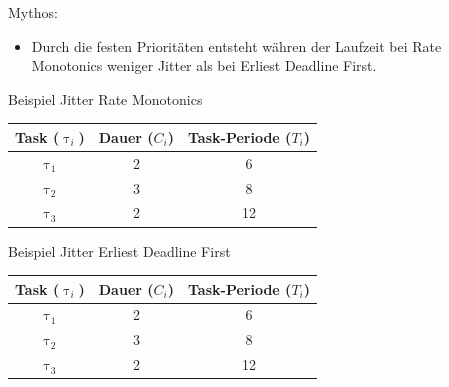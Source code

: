 \begin{frame}{\subsecname}
	Mythos:
	\begin{itemize}
		\item Durch die festen Prioritäten entsteht währen der Laufzeit bei Rate Monotonics weniger Jitter als bei Erliest Deadline First. 
	\end{itemize}
\end{frame}

\newcommand{\showRMSlideJit}[1] {\begin{frame}{Beispiel Jitter Rate Monotonics}
		\begin{center}
		\begin{tabular}{c||c|c}
			Task ($\uptau_i$) & Dauer ($C_i$) & Task-Periode ($T_i$)\\\hline\hline
			$\uptau_1$ & 2 & 6\\
			$\uptau_2$ & 3 & 8\\
			$\uptau_3$ & 2 & 12
		\end{tabular}
	\end{center}
	
\end{frame}}

%
{%
	\showRMSlideJit{\arabic{ct}}
}

\begin{frame}{Beispiel Jitter Erliest Deadline First}
		\begin{center}
		\begin{tabular}{c||c|c}
			Task ($\uptau_i$) & Dauer ($C_i$) & Task-Periode ($T_i$)\\\hline\hline
			$\uptau_1$ & 2 & 6\\
			$\uptau_2$ & 3 & 8\\
			$\uptau_3$ & 2 & 12
		\end{tabular}
	\end{center}
	
\end{frame}

